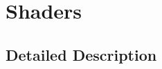 \hypertarget{group____shaders}{\section{Shaders}
\label{group____shaders}
}


\subsection{Detailed Description}
